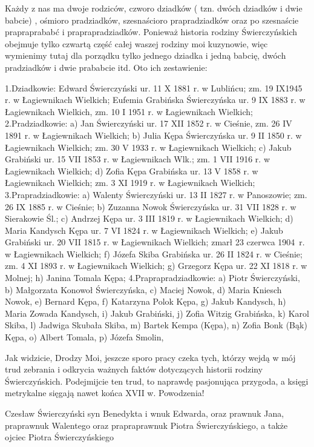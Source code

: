 Każdy z nas ma dwoje rodziców, czworo dziadków ( tzn. dwóch dziadków i dwie babcie) , ośmioro pradziadków, szesnaścioro prapradziadków oraz  po szesnaście prapraprababć  i praprapradziadków. Ponieważ historia rodziny Świerczyńskich obejmuje tylko czwartą część całej waszej  rodziny moi  kuzynowie, więc wymienimy tutaj dla porządku tylko jednego dziadka i jedną babcię, dwóch pradziadków i dwie prababcie itd. Oto ich zestawienie:


1.Dziadkowie: 
  Edward Świerczyński ur. 11 X 1881 r. w Lublińcu; zm. 19 IX1945 r. w Łagiewnikach Wielkich;
  Eufemia Grabińska Świerczyńska ur. 9 IX 1883 r. w Łagiewnikach Wielkich, zm. 10 I 1951 r. w Łagiewnikach Wielkich;
2.Pradziadkowie:
  a) Jan Świerczyński ur. 17 XII 1852 r. w Cieśnie, zm. 26 IV 1891 r. w Łagiewnikach Wielkich;
  b) Julia Kępa Świerczyńska ur. 9 II 1850 r. w Łagiewnikach Wielkich; zm. 30 V 1933 r. w Łagiewnikach Wielkich;
  c) Jakub Grabiński ur. 15 VII 1853 r. w Łagiewnikach Wlk.; zm. 1 VII 1916 r. w Łagiewnikach Wielkich;          
  d) Zofia Kępa Grabińska ur. 13 V 1858 r. w Łagiewnikach Wielkich; zm. 3 XI 1919 r. w Łagiewnikach Wielkich;
3.Prapradziadkowie:
a) Walenty Świerczyński ur. 13 II 1827 r. w Panoszowie; zm. 26 IX 1885 r. w Cieśnie;
b) Zuzanna Nowok Świerczyńska ur. 31 VII 1828 r. w Sierakowie Śl.;
c) Andrzej Kępa ur. 3 III 1819 r. w Łagiewnikach Wielkich;
d) Maria Kandysch Kępa ur. 7 VI 1824 r. w Łagiewnikach Wielkich;
e) Jakub Grabiński ur. 20 VII 1815 r. w Łagiewnikach Wielkich; zmarł 23 czerwca 1904~r. w Łagiewnikach Wielkich;
f) Józefa Skiba Grabińska ur. 26 II 1824 r. w Cieśnie; zm. 4 XI 1893 r. w Łagiewnikach Wielkich;
g) Grzegorz Kępa ur. 22 XI 1818 r. w Molnej;
h) Janina Tomala Kępa;
4.Praprapradziadkowie:
a) Piotr Świerczyński,
b) Małgorzata Konowoł Świerczyńska,
c) Maciej Nowok,
d) Maria Kniesch Nowok,
e) Bernard Kępa, 
f)  Katarzyna Polok Kępa,
g) Jakub Kandysch,
h) Maria Zowada Kandysch,
i) Jakub Grabiński,
j) Zofia Witzig Grabińska,
k) Karol Skiba,
l) Jadwiga Skubała Skiba,
m) Bartek Kempa (Kępa),
n) Zofia Bonk (Bąk) Kępa,
o) Albert Tomala,
p) Józefa Smolin,

Jak widzicie, Drodzy Moi, jeszcze sporo pracy czeka tych, którzy wejdą w mój trud zebrania i odkrycia ważnych faktów dotyczących historii rodziny Świerczyńskich. Podejmijcie ten trud, to naprawdę pasjonująca przygoda, a księgi metrykalne sięgają nawet końca XVII w.  Powodzenia! 

\begin{flushright}
Czesław Świerczyński
syn Benedykta i wnuk Edwarda, oraz prawnuk Jana, 
praprawnuk Walentego oraz prapraprawnuk Piotra Świerczyńskiego, a także ojciec Piotra Świerczyńskiego
\end{flushright}














